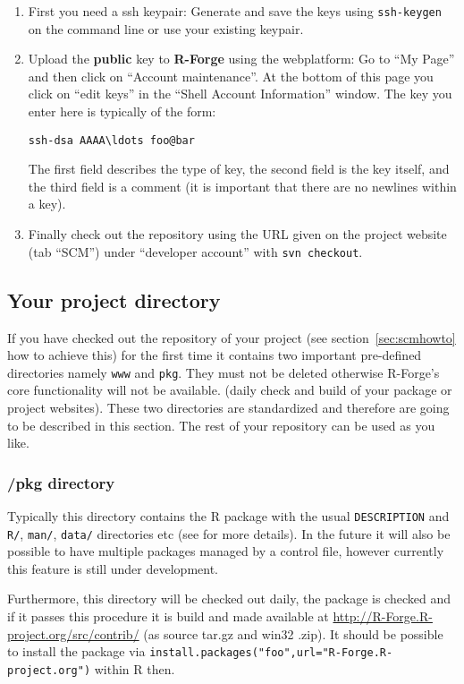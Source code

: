 \documentclass[a4paper]{article}
\begin{document}
\begin{enumerate}
\item First you need a ssh keypair: Generate and save the keys
  using \texttt{ssh-keygen} on the command line or use your existing keypair.  
\item Upload the \textbf{public} key to \textbf{R-Forge} using the
  webplatform: Go to
  ``My Page'' and then click on ``Account maintenance''. At the bottom
  of this page you click on ``edit keys'' in the ``Shell Account
  Information'' window. The key you enter here is typically of the
  form:
\begin{verbatim}
ssh-dsa AAAA\ldots foo@bar
\end{verbatim}
  The first field
  describes the type of key, the second field is the key itself, and
  the third field is a comment (it is important that there are no
  newlines within a key).
\item Finally check out the repository using the URL given on the
  project website (tab ``SCM'') under ``developer account'' with
  \texttt{svn checkout}.
\end{enumerate}

\subsection{Your project directory}
If you have checked out the repository of your project (see
section~\ref{sec:scmhowto} how to achieve this) for the first
time it contains two important pre-defined directories namely
\texttt{www} and \texttt{pkg}. They must not be
deleted otherwise R-Forge's core functionality will not be available.
(daily check and build of your package or project websites).
These two
directories are standardized and therefore are going to be described
in this section. The rest of your repository can be used as you like.

\subsubsection{/pkg directory}
Typically this directory contains the R package with the usual
\texttt{DESCRIPTION} and \texttt{R/}, \texttt{man/}, \texttt{data/}
directories etc (see \cite{Rcore:writing_R_extensions}
for more details).
In the future it will also be possible to have multiple
packages managed by a control file, however currently this feature is still
under development.

Furthermore, this directory will be checked out daily, the package is
checked and if it passes this procedure it is build and made available at\newline
\url{http://R-Forge.R-project.org/src/contrib/} (as source tar.gz and win32
.zip). It should be possible to install the package via
\texttt{install.packages("foo",url="R-Forge.R-project.org")} within R
then.
\end{document}
